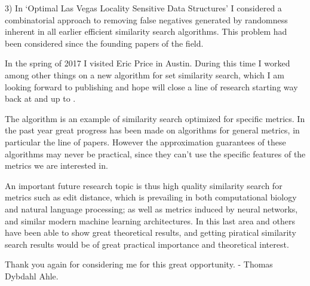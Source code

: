\documentclass[10pt]{article}
\begin{document}
3) In `Optimal Las Vegas Locality Sensitive Data Structures' I considered a combinatorial approach to removing false negatives generated by randomness inherent in all earlier efficient similarity search algorithms.
This problem had been considered since the founding papers of the field.

In the spring of 2017 I visited Eric Price in Austin.
During this time I worked among other things on a new algorithm for set similarity search, which I am looking forward to publishing and hope will close a line of research starting way back at \cite{broder1997resemblance} and up to \cite{christiani2017framework}.

The algorithm is an example of similarity search optimized for specific metrics.
In the past year great progress has been made on algorithms for general metrics, in particular the \cite{andoni2018holder} line of papers.
However the approximation guarantees of these algorithms may never be practical, since they can't use the specific features of the metrics we are interested in.

An important future research topic is thus high quality similarity search for metrics such as edit distance, which is prevailing in both computational biology and natural language processing; as well as metrics induced by neural networks, and similar modern machine learning architectures.
In this last area \cite{bora2017compressed} and others have been able to show great theoretical results, and getting piratical similarity search results would be of great practical importance and theoretical interest.


Thank you again for considering me for this great opportunity.
-
Thomas Dybdahl Ahle.



\end{document}
